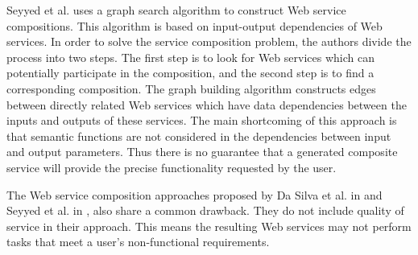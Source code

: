 Seyyed et al. \cite{5} uses a graph search algorithm to construct Web service compositions. This algorithm is based on input-output dependencies of Web services. In order to solve the service composition problem, the authors divide the process into two steps. The first step is to look for Web services which can potentially participate in the composition, and the second step is to find a corresponding composition. The graph building algorithm constructs edges between directly related Web services which have data dependencies between the inputs and outputs of these services. The main shortcoming of this approach is that semantic functions are not considered in the dependencies between input and output parameters. Thus there is no guarantee that a generated composite service will provide the precise functionality requested by the user.\par
The Web service composition approaches proposed by Da Silva et al. in \cite{2} and Seyyed et al. in \cite{5}, also share a common drawback. They do not include quality of service in their approach. This means the resulting Web services may not perform tasks that meet a user's non-functional requirements.\par

